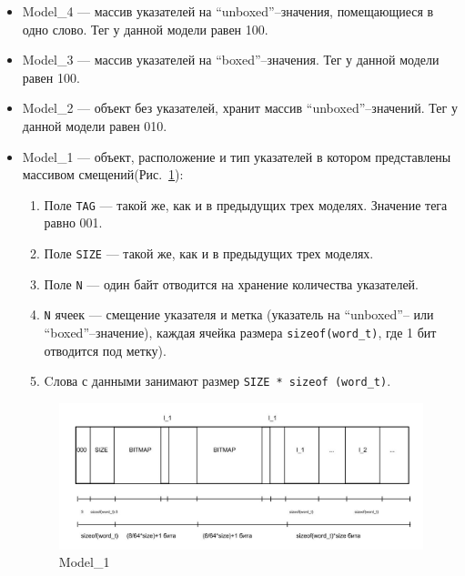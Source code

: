 \begin{itemize}
\item Model\_4 --- массив указателей на ``unboxed''--значения, помещающиеся в одно слово.
Тег у данной модели равен 100.
\item Model\_3 --- массив указателей на ``boxed''--значения.
Тег у данной модели равен 100.

\item Model\_2 --- объект без указателей, хранит массив ``unboxed''--значений.
Тег у данной модели равен 010.

\item Model\_1 --- объект, расположение и тип указателей в котором представлены массивом смещений(Рис.~\ref{second}):
\begin{enumerate}
\item Поле \lstinline{TAG} --- такой же, как и в предыдущих трех моделях. Значение тега равно 001.
\item Поле \lstinline{SIZE} --- такой же, как и в предыдущих трех моделях.
\item Поле \lstinline{N} --- один байт отводится на хранение количества указателей.
\item \lstinline{N} ячеек --- смещение указателя и метка (указатель на ``unboxed''-- или ``boxed''--значение), каждая ячейка размера \lstinline{sizeof(word_t)}, где 1 бит отводится под метку). 
\item Cлова с данными занимают размер \lstinline{SIZE * sizeof (word_t)}.
\end{enumerate}

\begin{figure}[h]
\includegraphics[width=1\textwidth]{Kren/2}
\caption{Model\_1}
\label{second}
\end{figure}


\end{itemize}
